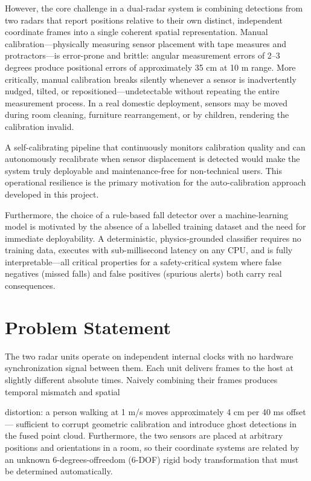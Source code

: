 However, the core challenge in a dual-radar system is combining detections from two radars that report positions relative to their own distinct, independent coordinate frames into a single coherent spatial representation. Manual calibration---physically measuring sensor placement with tape measures and protractors---is error-prone and brittle: angular measurement errors of 2--3 degrees produce positional errors of approximately 35 cm at 10 m range. More critically, manual calibration breaks silently whenever a sensor is inadvertently nudged, tilted, or repositioned---undetectable without repeating the entire measurement process. In a real domestic deployment, sensors may be moved during room cleaning, furniture rearrangement, or by children, rendering the calibration invalid. 

A self-calibrating pipeline that continuously monitors calibration quality and can autonomously recalibrate when sensor displacement is detected would make the system truly deployable and maintenance-free for non-technical users. This operational resilience is the primary motivation for the auto-calibration approach developed in this project. 

Furthermore, the choice of a rule-based fall detector over a machine-learning model is motivated by the absence of a labelled training dataset and the need for immediate deployability. A deterministic, physics-grounded classifier requires no training data, executes with sub-millisecond latency on any CPU, and is fully interpretable---all critical properties for a safety-critical system where false negatives (missed falls) and false positives (spurious alerts) both carry real consequences. 

\section{Problem Statement}

The two radar units operate on independent internal clocks with no hardware synchronization signal between them. Each unit delivers frames to the host at slightly different absolute times. Naively combining their frames produces temporal mismatch and spatial 


distortion: a person walking at 1 m/s moves approximately 4 cm per 40 ms offset--- sufficient to corrupt geometric calibration and introduce ghost detections in the fused point cloud. Furthermore, the two sensors are placed at arbitrary positions and orientations in a room, so their coordinate systems are related by an unknown 6-degrees-offreedom (6-DOF) rigid body transformation that must be determined automatically. 

